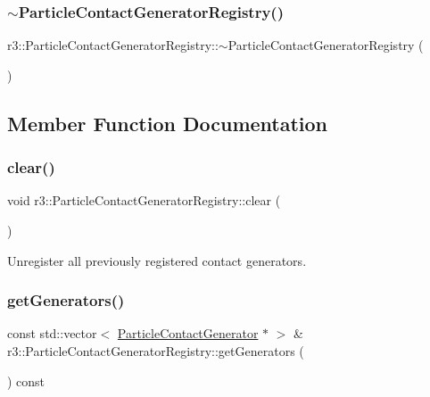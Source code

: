 \subsubsection{\texorpdfstring{$\sim$\+Particle\+Contact\+Generator\+Registry()}{~ParticleContactGeneratorRegistry()}}
{\footnotesize\ttfamily r3\+::\+Particle\+Contact\+Generator\+Registry\+::$\sim$\+Particle\+Contact\+Generator\+Registry (\begin{DoxyParamCaption}{ }\end{DoxyParamCaption})\hspace{0.3cm}{\ttfamily [default]}}



\subsection{Member Function Documentation}
\mbox{\label{classr3_1_1_particle_contact_generator_registry_a8c24a369a980542a769875466eb835d0}} 
\subsubsection{\texorpdfstring{clear()}{clear()}}
{\footnotesize\ttfamily void r3\+::\+Particle\+Contact\+Generator\+Registry\+::clear (\begin{DoxyParamCaption}{ }\end{DoxyParamCaption})}



Unregister all previously registered contact generators. 

\mbox{\label{classr3_1_1_particle_contact_generator_registry_a31b80b662b52afd910ba3d4d07fd8649}} 
\subsubsection{\texorpdfstring{get\+Generators()}{getGenerators()}}
{\footnotesize\ttfamily const std\+::vector$<$ \mbox{\hyperlink{classr3_1_1_particle_contact_generator}{Particle\+Contact\+Generator}} $\ast$ $>$ \& r3\+::\+Particle\+Contact\+Generator\+Registry\+::get\+Generators (\begin{DoxyParamCaption}{ }\end{DoxyParamCaption}) const}



